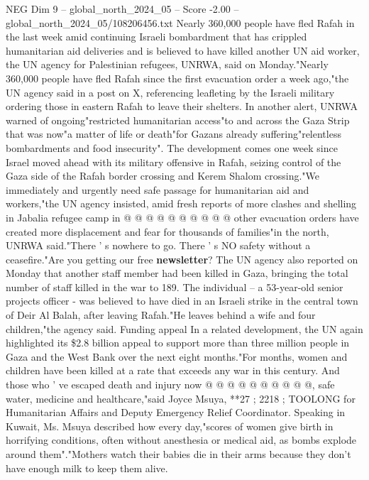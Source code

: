 \begin{textsample}{NEG Dim 9 – global\_north\_2024\_05 – Score -2.00 – global\_north\_2024\_05/108206456.txt}  \label{ex:f9_neg_157}
Nearly 360,000 people have fled Rafah in the last week amid continuing Israeli bombardment that has crippled humanitarian aid deliveries and is believed to have killed another UN aid worker, the UN agency for Palestinian refugees, UNRWA, said on Monday."Nearly 360,000 people have fled Rafah since the first evacuation order a week ago,"the UN agency said in a post on X, referencing leafleting by the Israeli military ordering those in eastern Rafah to leave their shelters.
In another alert, UNRWA warned of ongoing"restricted humanitarian access"to and across the Gaza Strip that was now"a matter of life or death"for Gazans already suffering"relentless bombardments and food insecurity".
The development comes one week since Israel moved ahead with its military offensive in Rafah, seizing control of the Gaza side of the Rafah border crossing and Kerem Shalom crossing."We immediately and urgently need safe passage for humanitarian aid and workers,"the UN agency insisted, amid fresh reports of more clashes and shelling in Jabalia refugee camp in @ @ @ @ @ @ @ @ @ @ other evacuation orders have created more displacement and fear for thousands of families"in the north, UNRWA said."There ' s nowhere to go.
There ' s NO safety without a ceasefire."Are you getting our free \textbf{newsletter}?
The UN agency also reported on Monday that another staff member had been killed in Gaza, bringing the total number of staff killed in the war to 189.
The individual -- a 53-year-old senior projects officer - was believed to have died in an Israeli strike in the central town of Deir Al Balah, after leaving Rafah."He leaves behind a wife and four children,"the agency said.
Funding appeal In a related development, the UN again highlighted its \$2.8 billion appeal to support more than three million people in Gaza and the West Bank over the next eight months."For months, women and children have been killed at a rate that exceeds any war in this century.
And those who ' ve escaped death and injury now @ @ @ @ @ @ @ @ @ @, safe water, medicine and healthcare,"said Joyce Msuya, **27 ; 2218 ; TOOLONG for Humanitarian Affairs and Deputy Emergency Relief Coordinator.
Speaking in Kuwait, Ms.
Msuya described how every day,"scores of women give birth in horrifying conditions, often without anesthesia or medical aid, as bombs explode around them"."Mothers watch their babies die in their arms because they don't have enough milk to keep them alive.

\end{textsample}
